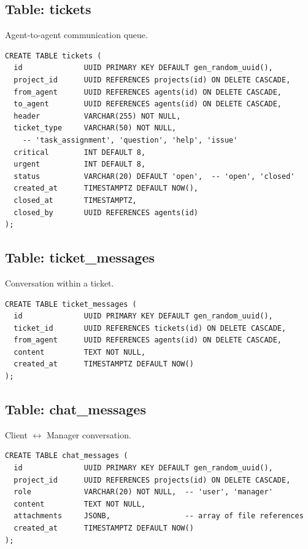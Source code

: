 \documentclass[11pt,a4paper]{article}
\begin{document}
\subsection{Table: tickets}

Agent-to-agent communication queue.

\begin{lstlisting}
CREATE TABLE tickets (
  id              UUID PRIMARY KEY DEFAULT gen_random_uuid(),
  project_id      UUID REFERENCES projects(id) ON DELETE CASCADE,
  from_agent      UUID REFERENCES agents(id) ON DELETE CASCADE,
  to_agent        UUID REFERENCES agents(id) ON DELETE CASCADE,
  header          VARCHAR(255) NOT NULL,
  ticket_type     VARCHAR(50) NOT NULL,
    -- 'task_assignment', 'question', 'help', 'issue'
  critical        INT DEFAULT 8,
  urgent          INT DEFAULT 8,
  status          VARCHAR(20) DEFAULT 'open',  -- 'open', 'closed'
  created_at      TIMESTAMPTZ DEFAULT NOW(),
  closed_at       TIMESTAMPTZ,
  closed_by       UUID REFERENCES agents(id)
);
\end{lstlisting}

\subsection{Table: ticket\_messages}

Conversation within a ticket.

\begin{lstlisting}
CREATE TABLE ticket_messages (
  id              UUID PRIMARY KEY DEFAULT gen_random_uuid(),
  ticket_id       UUID REFERENCES tickets(id) ON DELETE CASCADE,
  from_agent      UUID REFERENCES agents(id) ON DELETE CASCADE,
  content         TEXT NOT NULL,
  created_at      TIMESTAMPTZ DEFAULT NOW()
);
\end{lstlisting}

\subsection{Table: chat\_messages}

Client $\leftrightarrow$ Manager conversation.

\begin{lstlisting}
CREATE TABLE chat_messages (
  id              UUID PRIMARY KEY DEFAULT gen_random_uuid(),
  project_id      UUID REFERENCES projects(id) ON DELETE CASCADE,
  role            VARCHAR(20) NOT NULL,  -- 'user', 'manager'
  content         TEXT NOT NULL,
  attachments     JSONB,                 -- array of file references
  created_at      TIMESTAMPTZ DEFAULT NOW()
);
\end{lstlisting}
\end{document}
